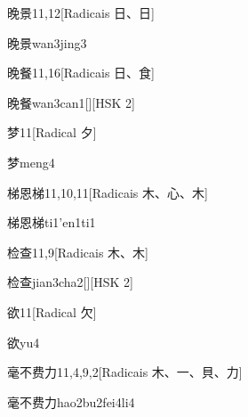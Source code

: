 \begin{entry}{晚景}{11,12}[Radicais ⽇、⽇]
  \begin{phonetics}{晚景}{wan3jing3}
  \end{phonetics}
\end{entry}

\begin{entry}{晚餐}{11,16}[Radicais ⽇、⾷]
  \begin{phonetics}{晚餐}{wan3can1}[][HSK 2]
  \end{phonetics}
\end{entry}

\begin{entry}{梦}{11}[Radical ⼣]
  \begin{phonetics}{梦}{meng4}
  \end{phonetics}
\end{entry}

\begin{entry}{梯恩梯}{11,10,11}[Radicais ⽊、⼼、⽊]
  \begin{phonetics}{梯恩梯}{ti1'en1ti1}
  \end{phonetics}
\end{entry}

\begin{entry}{检查}{11,9}[Radicais ⽊、⽊]
  \begin{phonetics}{检查}{jian3cha2}[][HSK 2]
  \end{phonetics}
\end{entry}

\begin{entry}{欲}{11}[Radical ⽋]
  \begin{phonetics}{欲}{yu4}
  \end{phonetics}
\end{entry}

\begin{entry}{毫不费力}{11,4,9,2}[Radicais ⽊、⼀、⾙、⼒]
  \begin{phonetics}{毫不费力}{hao2bu2fei4li4}
  \end{phonetics}
\end{entry}

